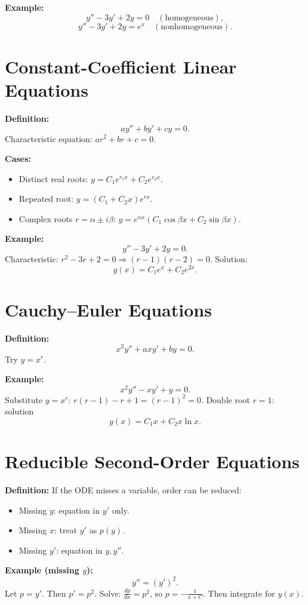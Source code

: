 \documentclass[12pt]{book}
\begin{document}
\textbf{Example:}
\[
y'' - 3y' + 2y = 0 \quad (\text{homogeneous}),
\]
\[
y'' - 3y' + 2y = e^x \quad (\text{nonhomogeneous}).
\]

\chapter{Constant-Coefficient Linear Equations}
\textbf{Definition:}
\[
a y'' + b y' + c y = 0.
\]
Characteristic equation: $a r^2 + b r + c = 0$.

\textbf{Cases:}
\begin{itemize}
  \item Distinct real roots: $y = C_1 e^{r_1 x} + C_2 e^{r_2 x}$.
  \item Repeated root: $y = (C_1 + C_2 x)e^{rx}$.
  \item Complex roots $r=\alpha \pm i\beta$: $y = e^{\alpha x}(C_1\cos \beta x + C_2 \sin \beta x)$.
\end{itemize}

\textbf{Example:}
\[
y'' - 3y' + 2y = 0.
\]
Characteristic: $r^2 - 3r + 2 = 0 \Rightarrow (r-1)(r-2)=0$.  
Solution:
\[
y(x) = C_1 e^x + C_2 e^{2x}.
\]

\chapter{Cauchy--Euler Equations}
\textbf{Definition:}
\[
x^2 y'' + a x y' + b y = 0.
\]
Try $y = x^r$.

\textbf{Example:}
\[
x^2 y'' - x y' + y = 0.
\]
Substitute $y = x^r$: $r(r-1) - r + 1 = (r-1)^2=0$.  
Double root $r=1$: solution
\[
y(x) = C_1 x + C_2 x \ln x.
\]

\chapter{Reducible Second-Order Equations}
\textbf{Definition:} If the ODE misses a variable, order can be reduced:
\begin{itemize}
  \item Missing $y$: equation in $y'$ only.
  \item Missing $x$: treat $y'$ as $p(y)$.
  \item Missing $y'$: equation in $y,y''$.
\end{itemize}

\textbf{Example (missing $y$):}
\[
y'' = (y')^2.
\]
Let $p=y'$. Then $p' = p^2$. Solve: $\tfrac{dp}{dx}=p^2$, so $p = -\frac{1}{x+C}$. Then integrate for $y(x)$.
\end{document}
